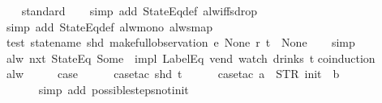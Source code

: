 \begin{isabellebody}
%
\isadelimproof
\ \ %
\endisadelimproof
%
\isatagproof
{}\isamarkupfalse%
\ standard\isanewline
\ \ \isamarkupfalse%
\ {\isacharparenleft}simp\ add{\isacharcolon}\ StateEq{\isacharunderscore}def\ alw{\isacharunderscore}iff{\isacharunderscore}sdrop{\isacharparenright}\isanewline
\ \ \isamarkupfalse%
\ {\isacharparenleft}simp\ add{\isacharcolon}\ StateEq{\isacharunderscore}def\ alw{\isacharunderscore}mono\ alw{\isacharunderscore}smap{\isacharparenright}%
\endisatagproof
{\isafoldproof}%
%
\isadelimproof
\isanewline
%
\endisadelimproof
\isanewline
{}\isamarkupfalse%
\ test{\isacharcolon}\ {\isachardoublequoteopen}statename\ {\isacharparenleft}shd\ {\isacharparenleft}make{\isacharunderscore}full{\isacharunderscore}observation\ e\ None\ r\ t{\isacharparenright}{\isacharparenright}\ {\isacharequal}\ None{\isachardoublequoteclose}\isanewline
%
\isadelimproof
\ \ %
\endisadelimproof
%
\isatagproof
{}\isamarkupfalse%
\ simp%
\endisatagproof
{\isafoldproof}%
%
\isadelimproof
\isanewline
%
\endisadelimproof
\isanewline
{}\isamarkupfalse%
\ {\isachardoublequoteopen}alw\ {\isacharparenleft}nxt\ {\isacharparenleft}StateEq\ {\isacharparenleft}Some\ {}{\isacharparenright}{\isacharparenright}\ impl\ {\isacharparenleft}LabelEq\ {\isacharprime}{\isacharprime}vend{\isacharprime}{\isacharprime}{\isacharparenright}{\isacharparenright}\ {\isacharparenleft}watch\ drinks\ t{\isacharparenright}{\isachardoublequoteclose}\isanewline
%
\isadelimproof
%
\endisadelimproof
%
\isatagproof
{}\isamarkupfalse%
{\isacharparenleft}coinduction{\isacharparenright}\isanewline
\ \ \isamarkupfalse%
\ alw\isanewline
\ \ \isamarkupfalse%
\ \isamarkupfalse%
\ {\isacharquery}case\isanewline
\ \ \ \ \isamarkupfalse%
\ {\isacharparenleft}case{\isacharunderscore}tac\ {\isachardoublequoteopen}shd\ t{\isachardoublequoteclose}{\isacharparenright}\isanewline
\ \ \ \ \isamarkupfalse%
\ {\isacharparenleft}case{\isacharunderscore}tac\ {\isachardoublequoteopen}a\ {\isacharequal}\ STR\ {\isacharprime}{\isacharprime}init{\isacharprime}{\isacharprime}\ {\isasymand}\ b\ {\isacharequal}\ {\isacharbrackleft}{\isacharbrackright}{\isachardoublequoteclose}{\isacharparenright}\isanewline
\ \ \ \ \ \isamarkupfalse%
\isanewline
\ \ \ \ \ \isamarkupfalse%
\ {\isacharparenleft}simp\ add{\isacharcolon}\ possible{\isacharunderscore}steps{\isacharunderscore}not{\isacharunderscore}init{\isacharparenright}\isanewline

\end{isabellebody}
